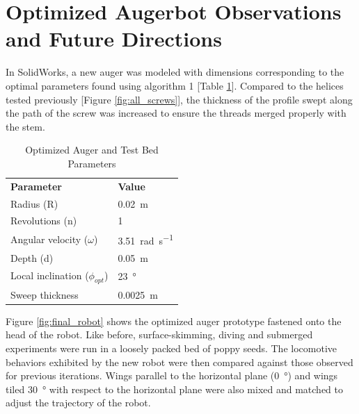 \documentclass[letterpaper, 11 pt]{article}
\begin{document}
\section{Optimized Augerbot Observations and Future Directions}
In SolidWorks, a new auger was modeled with dimensions corresponding to the optimal parameters found using algorithm 1 [Table \ref{optParamTable}]. Compared to the helices tested previously [Figure \ref{fig:all_screws}], the thickness of the profile swept along the path of the screw was increased to ensure the threads merged properly with the stem.   

\begin{table}[H] 
\begin{center}
\caption{Optimized Auger and Test Bed Parameters}
	\begin{tabular}{ l l}
	\textbf{Parameter} & \textbf{Value} \\
	Radius (R) & \SI{0.02}{\m} \\
	Revolutions (n) & 1 \\
	Angular velocity ($\omega$) & \SI{3.51}{\radian\per\s} \\
	Depth (d) & \SI{0.05}{\m}\\  
	Local inclination ($\phi_{opt}$) & \SI{23}{\degree}\\
	Sweep thickness & \SI{0.0025}{\m}
	\end{tabular}
	\label{optParamTable}
\end{center}
\end{table}

\medskip
Figure \ref{fig:final_robot} shows the optimized auger prototype fastened onto the head of the robot. Like before, surface-skimming, diving and submerged experiments were run in a loosely packed bed of poppy seeds. The locomotive behaviors exhibited by the new robot were then compared against those observed for previous iterations. Wings parallel to the horizontal plane (\SI{0}{\degree}) and wings tiled \SI{30}{\degree} with respect to the horizontal plane were also mixed and matched to adjust the trajectory of the robot.  
\end{document}
